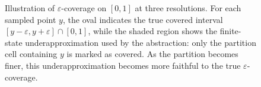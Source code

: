 \begin{figure}[t]
    \caption{Illustration of \(\varepsilon\)-coverage on \([0,1]\) at three resolutions. 
    For each sampled point \(y\), the oval indicates the true covered interval 
    \([y-\varepsilon,y+\varepsilon]\cap[0,1]\), while the shaded region shows the finite-state underapproximation used by the abstraction: only the partition cell containing \(y\) is marked as covered. As the partition becomes finer, this underapproximation becomes more faithful to the true $\varepsilon$-coverage.}
    \label{fig:epsilon-covering-underapprox}
\end{figure}
